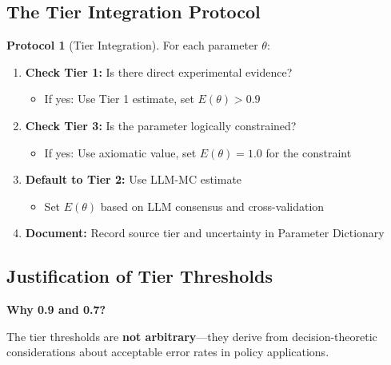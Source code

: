 \documentclass[11pt,a4paper]{article}
\theoremstyle{definition}
\newtheorem{protocol}{Protocol}[section]
\begin{document}
\subsection{The Tier Integration Protocol}

\begin{protocol}[Tier Integration]
\label{prot:tier-integration}
For each parameter $\theta$:
\begin{enumerate}
    \item \textbf{Check Tier 1:} Is there direct experimental evidence?
    \begin{itemize}
        \item If yes: Use Tier 1 estimate, set $E(\theta) > 0.9$
    \end{itemize}
    \item \textbf{Check Tier 3:} Is the parameter logically constrained?
    \begin{itemize}
        \item If yes: Use axiomatic value, set $E(\theta) = 1.0$ for the constraint
    \end{itemize}
    \item \textbf{Default to Tier 2:} Use LLM-MC estimate
    \begin{itemize}
        \item Set $E(\theta)$ based on LLM consensus and cross-validation
    \end{itemize}
    \item \textbf{Document:} Record source tier and uncertainty in Parameter Dictionary
\end{enumerate}
\end{protocol}




\subsection{Justification of Tier Thresholds}
\label{sec:bbb-tier-thresholds}

\textbf{Why 0.9 and 0.7?}

The tier thresholds are \textbf{not arbitrary}---they derive from decision-theoretic 
considerations about acceptable error rates in policy applications.
\end{document}
